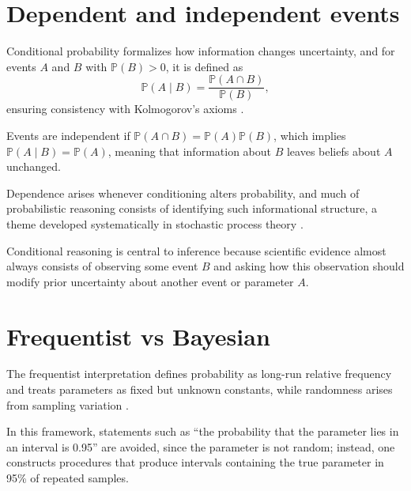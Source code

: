 
\section{Dependent and independent events}

Conditional probability formalizes how information changes uncertainty, and for events \(A\) and \(B\) with \(\mathbb{P}(B)>0\), it is defined as 
\[
\mathbb{P}(A \mid B) = \frac{\mathbb{P}(A \cap B)}{\mathbb{P}(B)},
\]
ensuring consistency with Kolmogorov’s axioms \cite{kolmogorov_1933_grundbegriffe}. 

\medskip

Events are independent if \(\mathbb{P}(A \cap B) = \mathbb{P}(A)\mathbb{P}(B)\), which implies \(\mathbb{P}(A \mid B) = \mathbb{P}(A)\), meaning that information about \(B\) leaves beliefs about \(A\) unchanged. 

\medskip

Dependence arises whenever conditioning alters probability, and much of probabilistic reasoning consists of identifying such informational structure, a theme developed systematically in stochastic process theory \cite{doob_1953_stochastic}. 

\medskip

Conditional reasoning is central to inference because scientific evidence almost always consists of observing some event \(B\) and asking how this observation should modify prior uncertainty about another event or parameter \(A\). 


\section{Frequentist vs Bayesian}

The frequentist interpretation defines probability as long-run relative frequency and treats parameters as fixed but unknown constants, while randomness arises from sampling variation \cite{vonmises_1928_truth,degroot_2012_probability}. 

\medskip

In this framework, statements such as “the probability that the parameter lies in an interval is 0.95” are avoided, since the parameter is not random; instead, one constructs procedures that produce intervals containing the true parameter in 95\% of repeated samples. 

